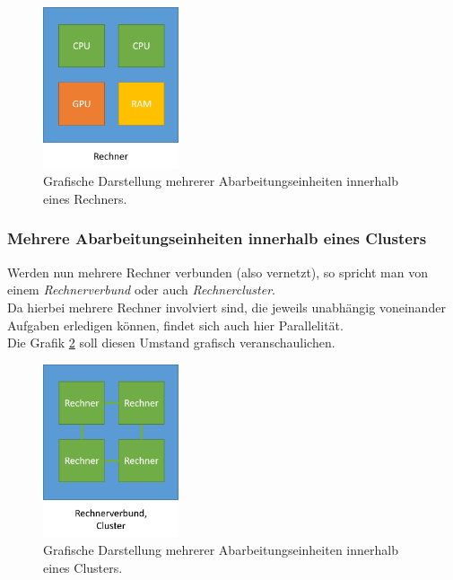 				\begin{figure}
					\centering	
					\includegraphics[width=4cm]{Abbildungen/Ebenen_der_Parallelitaet_Rechner.png}
					\caption{Grafische Darstellung mehrerer Abarbeitungseinheiten innerhalb eines Rechners.}
					\label{fig:EbenenDerParallelitaetRechner}
				\end{figure}
			
			\subsubsection{Mehrere Abarbeitungseinheiten innerhalb eines Clusters}
				\label{MehrereAbarbeitungseinheitenCluster}
			
				Werden nun mehrere Rechner verbunden (also vernetzt), so spricht man von einem \textit{Rechnerverbund} oder auch \textit{Rechnercluster}. \cite{RechnerverbundWikipedia}\\
				Da hierbei mehrere Rechner involviert sind, die jeweils unabhängig voneinander Aufgaben erledigen können, findet sich auch hier Parallelität.\\
				Die Grafik \ref{fig:EbenenDerParallelitaetCluster} soll diesen Umstand grafisch veranschaulichen. \cite{GrundlagenParallelisierungKegel}
				
				\begin{figure}
					\centering	
					\includegraphics[width=4cm]{Abbildungen/Ebenen_der_Parallelitaet_Cluster.png}
					\caption{Grafische Darstellung mehrerer Abarbeitungseinheiten innerhalb eines Clusters.}
					\label{fig:EbenenDerParallelitaetCluster}
				\end{figure}
			
